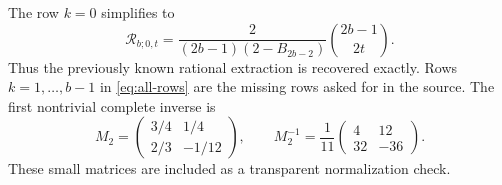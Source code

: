 \begin{remark}
The row $k=0$ simplifies to
\begin{equation}\label{eq:rational-row}
 \mathcal R_{b;0,t}=
 \frac{2}{(2b-1)(2-B_{2b-2})}\binom{2b-1}{2t}.
\end{equation}
Thus the previously known rational extraction is recovered exactly.
Rows $k=1,\ldots,b-1$ in \eqref{eq:all-rows} are the missing rows
asked for in the source. The first nontrivial complete inverse is
\begin{equation}\label{eq:b2inverse}
 M_2=
 \begin{pmatrix}3/4&1/4\\2/3&-1/12\end{pmatrix},\qquad
 M_2^{-1}=\frac1{11}
 \begin{pmatrix}4&12\\32&-36\end{pmatrix}.
\end{equation}
These small matrices are included as a transparent normalization check.
\end{remark}
